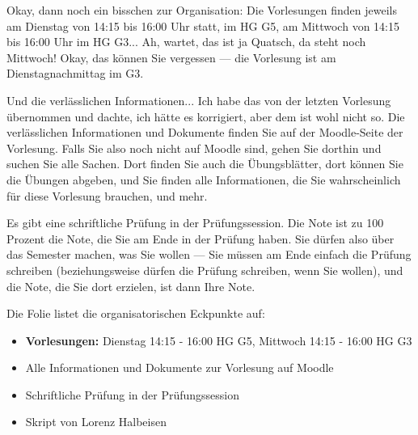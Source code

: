 \begin{spoken-clean}[00:02:41 - 00:04:00]
Okay, dann noch ein bisschen zur Organisation: Die Vorlesungen finden jeweils am Dienstag von 14:15 bis 16:00 Uhr statt, im HG G5, am Mittwoch von 14:15 bis 16:00 Uhr im HG G3... Ah, wartet, das ist ja Quatsch, da steht noch Mittwoch! Okay, das können Sie vergessen --- die Vorlesung ist am Dienstagnachmittag im G3.

Und die verlässlichen Informationen... Ich habe das von der letzten Vorlesung übernommen und dachte, ich hätte es korrigiert, aber dem ist wohl nicht so. Die verlässlichen Informationen und Dokumente finden Sie auf der Moodle-Seite der Vorlesung. Falls Sie also noch nicht auf Moodle sind, gehen Sie dorthin und suchen Sie alle Sachen. Dort finden Sie auch die Übungsblätter, dort können Sie die Übungen abgeben, und Sie finden alle Informationen, die Sie wahrscheinlich für diese Vorlesung brauchen, und mehr.

Es gibt eine schriftliche Prüfung in der Prüfungssession. Die Note ist zu 100 Prozent die Note, die Sie am Ende in der Prüfung haben. Sie dürfen also über das Semester machen, was Sie wollen --- Sie müssen am Ende einfach die Prüfung schreiben (beziehungsweise dürfen die Prüfung schreiben, wenn Sie wollen), und die Note, die Sie dort erzielen, ist dann Ihre Note.
\end{spoken-clean}

\begin{meta-note}
Die Folie listet die organisatorischen Eckpunkte auf:
\begin{itemize}
    \item \textbf{Vorlesungen:} Dienstag 14:15 - 16:00 HG G5, Mittwoch 14:15 - 16:00 HG G3 
    \item Alle Informationen und Dokumente zur Vorlesung auf Moodle
    \item Schriftliche Prüfung in der Prüfungssession
    \item Skript von Lorenz Halbeisen
\end{itemize}
\end{meta-note}

